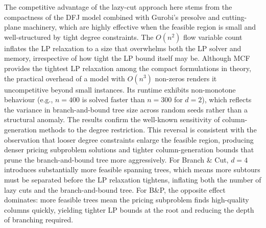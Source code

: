 \documentclass[12pt]{article}
\begin{document}
The competitive advantage of the lazy-cut approach here stems from the compactness of the DFJ model combined with Gurobi's presolve and cutting-plane machinery, which are highly effective when the feasible region is small and well-structured by tight degree constraints. The $O(n^2)$ flow variable count inflates the LP relaxation to a size that overwhelms both the LP solver and memory, irrespective of how tight the LP bound itself may be. Although MCF provides the tightest LP relaxation among the compact formulations in theory, the practical overhead of a model with $O(n^3)$ non-zeros renders it uncompetitive beyond small instances. Its runtime exhibits non-monotone behaviour (e.g., $n = 400$ is solved faster than $n = 300$ for $d = 2$), which reflects the variance in branch-and-bound tree size across random seeds rather than a structural anomaly. The results confirm the well-known sensitivity of column-generation methods to the degree restriction. This reversal is consistent with the observation that looser degree constraints enlarge the feasible region, producing denser pricing subproblem solutions and tighter column-generation bounds that prune the branch-and-bound tree more aggressively. For Branch \& Cut, $d = 4$ introduces substantially more feasible spanning trees, which means more subtours must be separated before the LP relaxation tightens, inflating both the number of lazy cuts and the branch-and-bound tree. For B\&P, the opposite effect dominates: more feasible trees mean the pricing subproblem finds high-quality columns quickly, yielding tighter LP bounds at the root and reducing the depth of branching required.


\end{document}
